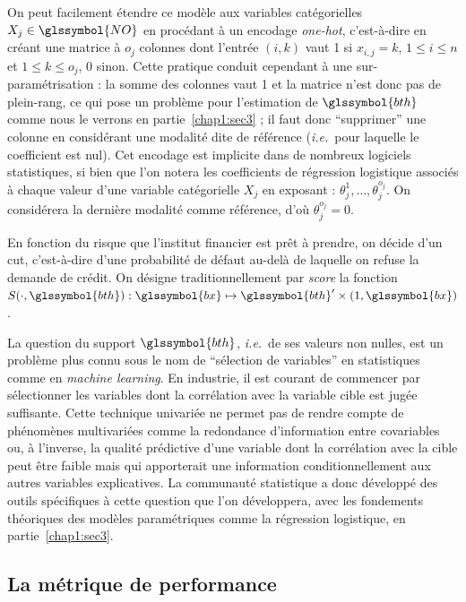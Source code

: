 On peut facilement étendre ce modèle aux variables catégorielles $X_j \in \glssymbol{NO}$ en procédant à un encodage \textit{one-hot}, c'est-à-dire en créant une matrice à $o_j$ colonnes dont l'entrée $(i,k)$ vaut 1 si $x_{i,j} = k$, $1 \leq i \leq n$ et $1 \leq k \leq o_j$, 0 sinon. Cette pratique conduit cependant à une sur-paramétrisation : la somme des colonnes vaut 1 et la matrice n'est donc pas de plein-rang, ce qui pose un problème pour l'estimation de $\glssymbol{bth}$ comme nous le verrons en partie~\ref{chap1:sec3} ; il faut donc ``supprimer'' une colonne en considérant une modalité dite de référence (\textit{i.e.}\ pour laquelle le coefficient est nul). Cet encodage est implicite dans de nombreux logiciels statistiques, si bien que l'on notera les coefficients de régression logistique associés à chaque valeur d'une variable catégorielle $X_j$ en exposant : $\theta_j^{1},\dots,\theta_j^{o_j}$. On considérera la dernière modalité comme référence, d'où $\theta_j^{o_j} = 0$.

En fonction du risque que l'institut financier est prêt à prendre, on décide d'un \gls{cut}, c'est-à-dire d'une probabilité de défaut au-delà de laquelle on refuse la demande de crédit. On désigne traditionnellement par \textit{score} la fonction $S(\cdot,\glssymbol{bth}): \glssymbol{bx} \mapsto \glssymbol{bth}' \times (1,\glssymbol{bx})$.

La question du support $\glssymbol{bth}$, \textit{i.e.}\ de ses valeurs non nulles, est un problème plus connu sous le nom de ``sélection de variables'' en statistiques comme en \textit{machine learning}. En industrie, il est courant de commencer par sélectionner les variables dont la corrélation avec la variable cible est jugée suffisante. Cette technique univariée ne permet pas de rendre compte de phénomènes multivariées comme la redondance d'information entre covariables ou, à l'inverse, la qualité prédictive d'une variable dont la corrélation avec la cible peut être faible mais qui apporterait une information conditionnellement aux autres variables explicatives. La communauté statistique a donc développé des outils spécifiques à cette question que l'on développera, avec les fondements théoriques des modèles paramétriques comme la régression logistique, en partie~\ref{chap1:sec3}.

\subsection{La métrique de performance}

